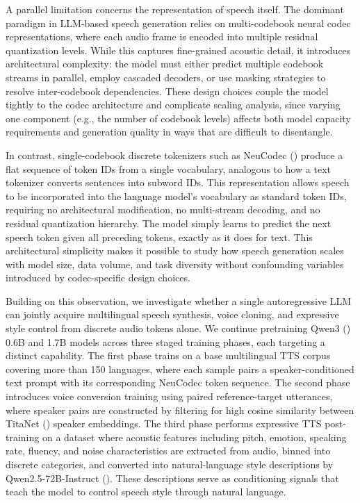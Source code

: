 \documentclass{article}
\begin{document}
A parallel limitation concerns the representation of speech itself. The dominant paradigm in LLM-based speech generation relies on multi-codebook neural codec representations, where each audio frame is encoded into multiple residual quantization levels. While this captures fine-grained acoustic detail, it introduces architectural complexity: the model must either predict multiple codebook streams in parallel, employ cascaded decoders, or use masking strategies to resolve inter-codebook dependencies. These design choices couple the model tightly to the codec architecture and complicate scaling analysis, since varying one component (e.g., the number of codebook levels) affects both model capacity requirements and generation quality in ways that are difficult to disentangle.
 
In contrast, single-codebook discrete tokenizers such as NeuCodec (\citet{julian2025finitescalarquantizationenables}) produce a flat sequence of token IDs from a single vocabulary, analogous to how a text tokenizer converts sentences into subword IDs. This representation allows speech to be incorporated into the language model's vocabulary as standard token IDs, requiring no architectural modification, no multi-stream decoding, and no residual quantization hierarchy. The model simply learns to predict the next speech token given all preceding tokens, exactly as it does for text. This architectural simplicity makes it possible to study how speech generation scales with model size, data volume, and task diversity without confounding variables introduced by codec-specific design choices.
 
Building on this observation, we investigate whether a single autoregressive LLM can jointly acquire multilingual speech synthesis, voice cloning, and expressive style control from discrete audio tokens alone. We continue pretraining Qwen3 (\citet{yang2025qwen3technicalreport}) 0.6B and 1.7B models across three staged training phases, each targeting a distinct capability. The first phase trains on a base multilingual TTS corpus covering more than 150 languages, where each sample pairs a speaker-conditioned text prompt with its corresponding NeuCodec token sequence. The second phase introduces voice conversion training using paired reference-target utterances, where speaker pairs are constructed by filtering for high cosine similarity between TitaNet (\citet{koluguri2022titanet}) speaker embeddings. The third phase performs expressive TTS post-training on a dataset where acoustic features including pitch, emotion, speaking rate, fluency, and noise characteristics are extracted from audio, binned into discrete categories, and converted into natural-language style descriptions by Qwen2.5-72B-Instruct (\citet{qwen2025qwen25technicalreport}). These descriptions serve as conditioning signals that teach the model to control speech style through natural language.
 
\end{document}
